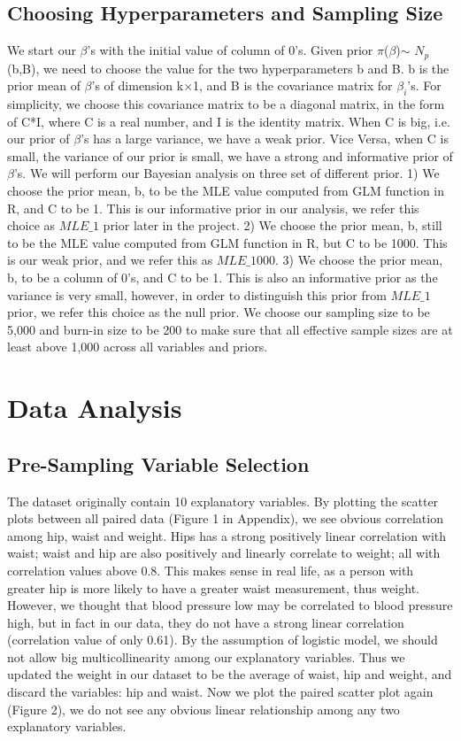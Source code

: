 \documentclass[paper=letterpaper,fontsize=12pt,twoside,american]{scrartcl}
\begin{document}
\subsection{Choosing Hyperparameters and Sampling Size}
We start our $\beta$'s with the initial value of column of 0's. Given prior $\pi$($\beta$)$\sim$ $N_p$(b,B), we need to choose the value for the two hyperparameters b and B. b is the prior mean of $\beta$'s of dimension k$\times$1, and B is the covariance matrix for $\beta_{i}$'s. For simplicity, we choose this covariance matrix to be a diagonal matrix, in the form of C*I, where C is a real number, and I is the identity matrix. When C is big, i.e. our prior of $\beta$'s has a large variance, we have a weak prior. Vice Versa, when C is small, the variance of our prior is small, we have a strong and informative prior of $\beta$'s. We will perform our Bayesian analysis on three set of different prior. 1) We choose the prior mean, b, to be the MLE value computed from GLM function in R, and C to be 1. This is our informative prior in our analysis, we refer this choice as $MLE\_1$ prior later in the project. 2) We choose the prior mean, b, still to be the MLE value computed from GLM function in R, but C to be 1000. This is our weak prior, and we refer this as $MLE\_1000$. 3) We choose the prior mean, b, to be a column of 0's, and C to be 1. This is also an informative prior as the variance is very small, however, in order to distinguish this prior from $MLE\_1$ prior, we refer this choice as the null prior.
\newline
\newline
We choose our sampling size to be 5,000 and burn-in size to be 200 to make sure that all effective sample sizes are at least above 1,000 across all variables and priors. 
\section{Data Analysis}
\subsection{Pre-Sampling Variable Selection}
The dataset originally contain 10 explanatory variables. By plotting the scatter plots between all paired data (Figure 1 in Appendix), we see obvious correlation among hip, waist and weight. Hips has a strong positively linear correlation with waist; waist and hip are also positively and linearly correlate to weight; all with correlation values above 0.8. This makes sense in real life, as a person with greater hip is more likely to have a greater waist measurement, thus weight. However, we thought that blood pressure low may be correlated to blood pressure high, but in fact in our data, they do not have a strong linear correlation (correlation value of only 0.61). By the assumption of logistic model, we should not allow big multicollinearity among our explanatory variables. Thus we updated the weight in our dataset to be the average of waist, hip and weight, and discard the variables: hip and waist. Now we plot the paired scatter plot again (Figure 2), we do not see any obvious linear relationship among any two explanatory variables. 
\end{document}
